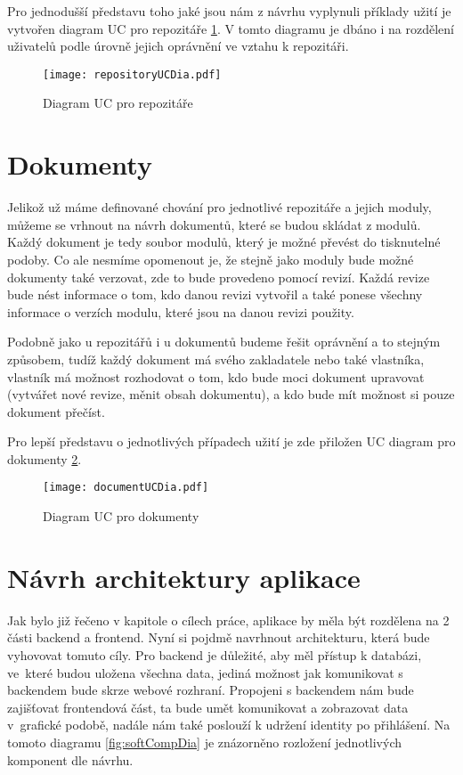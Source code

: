 Pro jednodušší představu toho jaké jsou nám z návrhu vyplynuli příklady užití je vytvořen diagram UC pro repozitáře \ref{fig:repositoryUC}. V tomto diagramu je dbáno i na rozdělení
uživatelů podle úrovně jejich oprávnění ve vztahu k repozitáři.

\begin{figure}[H]
    \centering
    \texttt{[image: repositoryUCDia.pdf]}
    \caption{Diagram UC pro repozitáře}
    \label{fig:repositoryUC}
\end{figure}

\section{Dokumenty}

Jelikož už máme definované chování pro jednotlivé repozitáře a jejich moduly, můžeme se vrhnout na návrh dokumentů, které se budou skládat z modulů. Každý
dokument je tedy soubor modulů, který je možné převést do tisknutelné podoby. Co ale nesmíme opomenout je, že stejně jako moduly bude možné dokumenty také
verzovat, zde to bude provedeno pomocí revizí. Každá revize bude nést informace o tom, kdo danou revizi vytvořil a také ponese všechny informace o verzích
modulu, které jsou na danou revizi použity.

Podobně jako u repozitářů i u dokumentů budeme řešit oprávnění a to stejným způsobem, tudíž každý dokument má svého zakladatele nebo také vlastníka,
vlastník má možnost rozhodovat o tom, kdo bude moci dokument upravovat (vytvářet nové revize, měnit obsah dokumentu), a kdo bude mít možnost si pouze dokument
přečíst.

Pro lepší představu o jednotlivých případech užití je zde přiložen UC diagram pro dokumenty \ref{fig:documentUC}.

\begin{figure}[H]
    \centering
    \texttt{[image: documentUCDia.pdf]}
    \caption{Diagram UC pro dokumenty}
    \label{fig:documentUC}
\end{figure}

\section{Návrh architektury aplikace}

Jak bylo již řečeno v kapitole o cílech práce, aplikace by měla být rozdělena na 2 části backend a frontend. Nyní si pojdmě navrhnout architekturu, která bude
vyhovovat tomuto cíly. Pro backend je důležité, aby měl přístup k databázi, ve~které budou uložena všechna data, jediná možnost jak komunikovat s backendem bude
skrze webové rozhraní. Propojeni s backendem nám bude zajišťovat frontendová část, ta bude umět komunikovat a zobrazovat data v~grafické podobě, nadále nám také
poslouží k udržení identity po přihlášení. Na tomoto diagramu \ref{fig:softCompDia} je znázorněno rozložení jednotlivých komponent dle návrhu.

